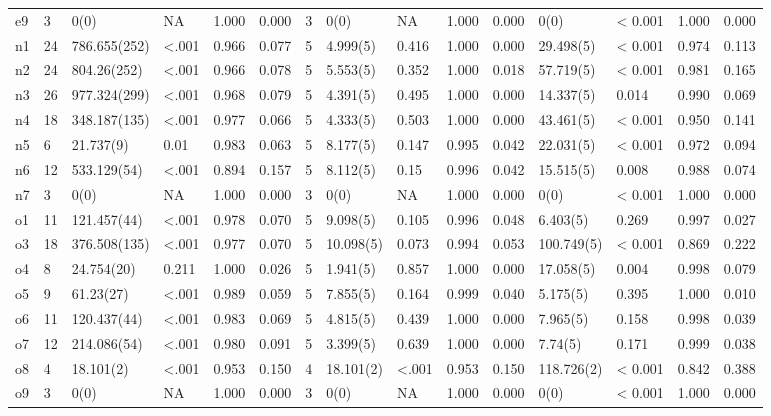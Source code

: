 \documentclass[man]{apa6}
\theoremstyle{definition}
\theoremstyle{definition}
\theoremstyle{definition}
\theoremstyle{remark}
\begin{document}
\begin{table}
{\begin{tabular}[t]{lllllllllllllll}
e9 & 3 & 0(0) & NA & 1.000 & 0.000 & 3 & 0(0) & NA & 1.000 & 0.000 & 0(0) & < 0.001 & 1.000 & 0.000\\
n1 & 24 & 786.655(252) & <.001 & 0.966 & 0.077 & 5 & 4.999(5) & 0.416 & 1.000 & 0.000 & 29.498(5) & < 0.001 & 0.974 & 0.113\\
n2 & 24 & 804.26(252) & <.001 & 0.966 & 0.078 & 5 & 5.553(5) & 0.352 & 1.000 & 0.018 & 57.719(5) & < 0.001 & 0.981 & 0.165\\
n3 & 26 & 977.324(299) & <.001 & 0.968 & 0.079 & 5 & 4.391(5) & 0.495 & 1.000 & 0.000 & 14.337(5) & 0.014 & 0.990 & 0.069\\
n4 & 18 & 348.187(135) & <.001 & 0.977 & 0.066 & 5 & 4.333(5) & 0.503 & 1.000 & 0.000 & 43.461(5) & < 0.001 & 0.950 & 0.141\\
n5 & 6 & 21.737(9) & 0.01 & 0.983 & 0.063 & 5 & 8.177(5) & 0.147 & 0.995 & 0.042 & 22.031(5) & < 0.001 & 0.972 & 0.094\\
n6 & 12 & 533.129(54) & <.001 & 0.894 & 0.157 & 5 & 8.112(5) & 0.15 & 0.996 & 0.042 & 15.515(5) & 0.008 & 0.988 & 0.074\\
n7 & 3 & 0(0) & NA & 1.000 & 0.000 & 3 & 0(0) & NA & 1.000 & 0.000 & 0(0) & < 0.001 & 1.000 & 0.000\\
o1 & 11 & 121.457(44) & <.001 & 0.978 & 0.070 & 5 & 9.098(5) & 0.105 & 0.996 & 0.048 & 6.403(5) & 0.269 & 0.997 & 0.027\\
o3 & 18 & 376.508(135) & <.001 & 0.977 & 0.070 & 5 & 10.098(5) & 0.073 & 0.994 & 0.053 & 100.749(5) & < 0.001 & 0.869 & 0.222\\
o4 & 8 & 24.754(20) & 0.211 & 1.000 & 0.026 & 5 & 1.941(5) & 0.857 & 1.000 & 0.000 & 17.058(5) & 0.004 & 0.998 & 0.079\\
o5 & 9 & 61.23(27) & <.001 & 0.989 & 0.059 & 5 & 7.855(5) & 0.164 & 0.999 & 0.040 & 5.175(5) & 0.395 & 1.000 & 0.010\\
o6 & 11 & 120.437(44) & <.001 & 0.983 & 0.069 & 5 & 4.815(5) & 0.439 & 1.000 & 0.000 & 7.965(5) & 0.158 & 0.998 & 0.039\\
o7 & 12 & 214.086(54) & <.001 & 0.980 & 0.091 & 5 & 3.399(5) & 0.639 & 1.000 & 0.000 & 7.74(5) & 0.171 & 0.999 & 0.038\\
o8 & 4 & 18.101(2) & <.001 & 0.953 & 0.150 & 4 & 18.101(2) & <.001 & 0.953 & 0.150 & 118.726(2) & < 0.001 & 0.842 & 0.388\\
o9 & 3 & 0(0) & NA & 1.000 & 0.000 & 3 & 0(0) & NA & 1.000 & 0.000 & 0(0) & < 0.001 & 1.000 & 0.000\\
\bottomrule
\end{tabular}}
\end{table}
\end{document}
